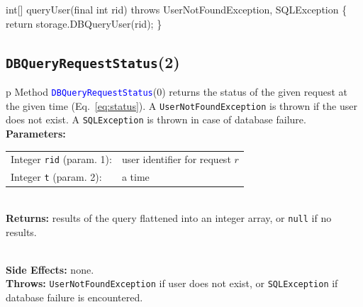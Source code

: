 \nwenddocs{}\endmoddef{}
int[] queryUser(final int rid) throws UserNotFoundException, SQLException \{
  return storage.DBQueryUser(rid);
\}
\eatline
{}\nwendcode{}\nwdocspar
\subsection{\texttt{DBQueryRequestStatus}(2)}
\begin{tabular}{p{\textwidth}}
\toprule
{}
Method \textcolor{blue}{{\tt{}\protect{}DBQueryRequestStatus}}(0) returns the status of
the given request at the given time (Eq.~\ref{eq:status}).
A {\tt{}UserNotFoundException} is thrown if the user does not exist.
A {\tt{}SQLException} is thrown in case of database failure.\\
\midrule
\textbf{Parameters:} \\
\begin{tabular}{lp{116mm}}
Integer {\tt{}rid} (param. 1):&user identifier for request $r$\\
Integer {\tt{}t} (param. 2):&a time
\end{tabular}\\
\textbf{Returns:} results of the query flattened into an integer array, or
{\tt{}null} if no results.

\\
\textbf{Side Effects:} none.\\
\textbf{Throws:} {\tt{}UserNotFoundException} if user does not exist, or
{\tt{}SQLException} if database failure is encountered.\\
\bottomrule
\end{tabular}
\nwenddocs{}\endmoddef{}
